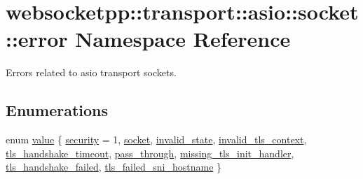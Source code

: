 \hypertarget{namespacewebsocketpp_1_1transport_1_1asio_1_1socket_1_1error}{}\section{websocketpp\+:\+:transport\+:\+:asio\+:\+:socket\+:\+:error Namespace Reference}
\label{namespacewebsocketpp_1_1transport_1_1asio_1_1socket_1_1error}


Errors related to asio transport sockets.  


\subsection*{Enumerations}
\begin{DoxyCompactItemize}
\item 
enum \mbox{\hyperlink{namespacewebsocketpp_1_1transport_1_1asio_1_1socket_1_1error_a828ddaa5ed63a761e1b557465a35f05a}{value}} \{ \newline
\mbox{\hyperlink{namespacewebsocketpp_1_1transport_1_1asio_1_1socket_1_1error_a828ddaa5ed63a761e1b557465a35f05aacaab9f83cf829c57e4d1c76eafff7540}{security}} = 1, 
\mbox{\hyperlink{namespacewebsocketpp_1_1transport_1_1asio_1_1socket_1_1error_a828ddaa5ed63a761e1b557465a35f05aa0c31b356014843e1d09514e794a539a7}{socket}}, 
\mbox{\hyperlink{namespacewebsocketpp_1_1transport_1_1asio_1_1socket_1_1error_a828ddaa5ed63a761e1b557465a35f05aa380b076a3c91fb5336539d7f4d395777}{invalid\+\_\+state}}, 
\mbox{\hyperlink{namespacewebsocketpp_1_1transport_1_1asio_1_1socket_1_1error_a828ddaa5ed63a761e1b557465a35f05aa2ad7fa2055918823bdedb031839de9de}{invalid\+\_\+tls\+\_\+context}}, 
\newline
\mbox{\hyperlink{namespacewebsocketpp_1_1transport_1_1asio_1_1socket_1_1error_a828ddaa5ed63a761e1b557465a35f05aa6ae4c96e0d2a177bb3c8eab1c45ccda0}{tls\+\_\+handshake\+\_\+timeout}}, 
\mbox{\hyperlink{namespacewebsocketpp_1_1transport_1_1asio_1_1socket_1_1error_a828ddaa5ed63a761e1b557465a35f05aaa4b14e51bb97d6ab9654ee7219ffca30}{pass\+\_\+through}}, 
\mbox{\hyperlink{namespacewebsocketpp_1_1transport_1_1asio_1_1socket_1_1error_a828ddaa5ed63a761e1b557465a35f05aa295e5ba0b108125ce445aa2ce1ec45cd}{missing\+\_\+tls\+\_\+init\+\_\+handler}}, 
\mbox{\hyperlink{namespacewebsocketpp_1_1transport_1_1asio_1_1socket_1_1error_a828ddaa5ed63a761e1b557465a35f05aa61f1919da9afed818c8533b0dcf9d2db}{tls\+\_\+handshake\+\_\+failed}}, 
\newline
\mbox{\hyperlink{namespacewebsocketpp_1_1transport_1_1asio_1_1socket_1_1error_a828ddaa5ed63a761e1b557465a35f05aa5eb29de1a4e86186b431ead37d402970}{tls\+\_\+failed\+\_\+sni\+\_\+hostname}}
 \}
\end{DoxyCompactItemize}


